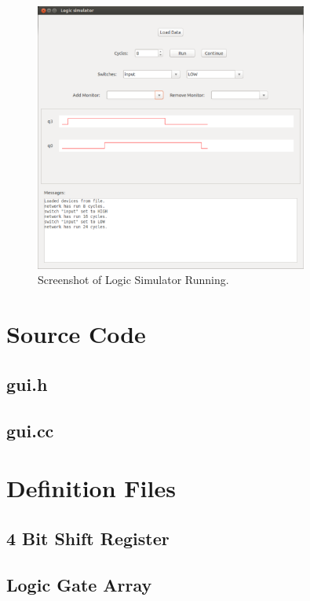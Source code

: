 \documentclass[a4paper,10pt]{article}  %
\begin{document}
\begin{figure}[htb]
  \begin{center}
    \includegraphics[width=0.8\textwidth]{Screenshot.pdf}
  \end{center}
  \caption{Screenshot of Logic Simulator Running.}
  \label{fig:scrnsht}
\end{figure}

\newpage
\appendix

\section{Source Code}
\label{sec:source-code}

\subsection{gui.h}
\label{sec:gui.h}



\subsection{gui.cc}
\label{sec:gui.cc}



\section{Definition Files}
\label{sec:definition-files}

\subsection{4 Bit Shift Register}


\subsection{Logic Gate Array}

\end{document}
